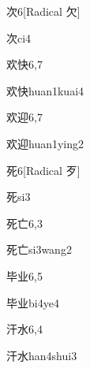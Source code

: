 \begin{entry}{次}{6}[Radical ⽋]
  \begin{phonetics}{次}{ci4}
  \end{phonetics}
\end{entry}

\begin{entry}{欢快}{6,7}
  \begin{phonetics}{欢快}{huan1kuai4}
  \end{phonetics}
\end{entry}

\begin{entry}{欢迎}{6,7}
  \begin{phonetics}{欢迎}{huan1ying2}
  \end{phonetics}
\end{entry}

\begin{entry}{死}{6}[Radical 歹]
  \begin{phonetics}{死}{si3}
  \end{phonetics}
\end{entry}

\begin{entry}{死亡}{6,3}
  \begin{phonetics}{死亡}{si3wang2}
  \end{phonetics}
\end{entry}

\begin{entry}{毕业}{6,5}
  \begin{phonetics}{毕业}{bi4ye4}
  \end{phonetics}
\end{entry}

\begin{entry}{汗水}{6,4}
  \begin{phonetics}{汗水}{han4shui3}
  \end{phonetics}
\end{entry}


